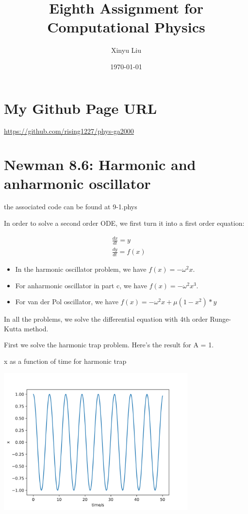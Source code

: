\documentclass[letterpaper,12pt]{article}
\title{Eighth Assignment for Computational Physics}
\date{\today}
\author{Xinyu Liu}
\begin{document}
\maketitle
\tableofcontents

\newpage

\section{My Github Page URL}
\url{https://github.com/rising1227/phys-ga2000}

\section{Newman 8.6: Harmonic and anharmonic oscillator}

the associated code can be found at 9-1.phys

In order to solve a second order ODE, we first turn it into a first order equation:

\begin{align}
    & \frac{dx}{dt} = y\\
    & \frac{dy}{dt} = f(x)
\end{align}

\begin{itemize}
    \item In the harmonic oscillator problem, we have $f(x) = -\omega^2 x$.
    \item For anharmonic oscillator in part c, we have $f(x) = -\omega^2 x^3$.
    \item For van der Pol oscillator, we have $f(x) = -\omega^2 x + \mu (1-x^2)*y$
\end{itemize}

In all the problems, we solve the differential equation with 4th order Runge-Kutta method.

First we solve the harmonic trap problem. Here's the result for A = 1.

\begin{table}[!h]
    \centering
    \caption{x as a function of time for harmonic trap}
    \includegraphics[width=10cm]{9-6a.png}
\end{table}%
\newpage
\end{document}
